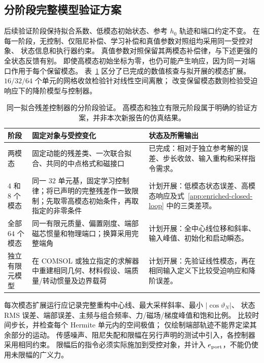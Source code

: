 \subsection{分阶段完整模型验证方案}
\label{app:staged-validation}
后续验证阶段保持拟合系数、低模态初始状态、参考 $h_0$ 轨迹和端口约定不变。
在每一阶段，无控制、仅阻尼补偿、学习补偿和真值参数对照组均采用同一受控对象、
状态信息和执行器约束。
真值参数对照保留其两模态补偿律，与下述更强的全状态反馈有别。
即使高模态初始坐标为零，也仍可能产生响应，因为同一对端口作用于每个保留模态。
表~\ref{app:validation-stages} 区分了已完成的数值核查与拟开展的模态扩展。
$16/32/64$ 个单元的网格收敛检验针对线性空间离散；
改变保留模态数则检验受迫响应下的降阶模型与控制器。

\begin{table}[t]
\centering\small
\caption{同一拟合残差控制器的分阶段验证。
高模态和独立有限元阶段属于明确的验证方案，并非本次新报告的仿真结果。}
\label{app:validation-stages}
\begin{tabular}{p{}p{}p{}}
\toprule
阶段 & 固定对象与受控变化 & 状态及所需输出\\
\midrule
两模态 & 固定动能的残差类、一次联合拟合、共同的中点格式和磁接口 & 已完成：相对于独立参考解的误差、步长收敛、输入重构和采样指令需求。\\
$4$ 和 $8$ 个模态 & 同一 $32$ 单元基，固定学习控制律；将已声明的完整残差作一致限制；先取零高模态初始条件，再取指定的非零条件 & 计划开展：低模态状态误差、高模态响应及式~\eqref{app:enriched-closed-loop} 中的三类差项。\\
全部 $64$ 个模态 & 同一有限元质量、偏置刚度、端部磁芯惯量和物理端口；换算采用完整端角 & 计划开展：全中心线位移和斜率、输入峰值、初始化和启动瞬态。\\
独立有限元模型 & 在 COMSOL 或独立指定的求解器中重建相同几何、材料假设、端质量/转动惯量及边界载荷 & 计划开展：先验证线性模态，再在相同输入定义下比较受迫响应和降阶误差。\\
\bottomrule
\end{tabular}
\end{table}

每次模态扩展运行应记录完整重构中心线、最大采样斜率、最小 $|\cos\vartheta_N|$、
状态 RMS 误差、端部误差、主频与组合频率、力/磁场/梯度峰值和饱和比例。
比较时间步长，并检查每个 Hermite 单元内的空间极值；
仅绘制端部轨迹不能界定梁其余部分的运动。
传感噪声、阻尼失配和限幅在另行声明的测试中引入，各控制器采用相同约束。
限幅后的指令必须实际施加到受控对象，并计入 $e_{\rm port}$，不能仍使用未限幅的广义力。


